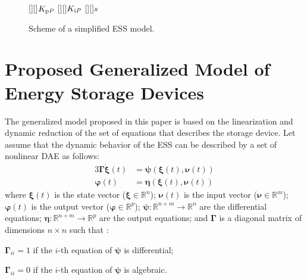 \documentclass[journal, a4paper]{IEEEtran}
\begin{document}
\begin{figure}[h!]
  \begin{center}
    \psfrag{+}{\tiny{$+$}}    
    \psfrag{-}{\tiny{$-$}}
    [][]{$K_{\rm p \it{P}}$}
    [][]{$K_{\rm i \it{P}}$}
[][]{$s$}
    \caption{Scheme of a simplified ESS model.}
    \label{simplescheme}
  \end{center}
\vspace{-0.4cm}
\end{figure}




\section{Proposed Generalized Model of Energy Storage Devices}
\label{sec:genmodel}

The generalized model proposed in this paper is based on the
linearization and dynamic reduction of the set of equations that
describes the storage device.  Let assume that the dynamic behavior of
the ESS can be described by a set of nonlinear DAE as
follows:
\begin{alignat}{3}
  \nonumber \boldsymbol{\Gamma} \dot{\boldsymbol{\xi}}(t) &= 
  \boldsymbol{\psi}(\boldsymbol{\xi}(t),\boldsymbol{\nu}(t))\\
  \boldsymbol{\varphi}(t) &=
  \boldsymbol{\eta}(\boldsymbol{\xi}(t),\boldsymbol{\nu}(t))
  \label{DAE}
\end{alignat}
where $\boldsymbol{\xi}(t)$ is the state vector ($\boldsymbol{\xi} \in
\mathbb{R}^n$); $\boldsymbol{\nu}(t)$ is the input vector
($\boldsymbol{\nu} \in \mathbb{R}^m$); $\boldsymbol{\varphi}(t)$ is
the output vector ($\boldsymbol{\varphi} \in \mathbb{R}^p$);
$\boldsymbol{\psi} : \mathbb{R}^{n+m} \rightarrow \mathbb{R}^n$ are
the differential equations; $\boldsymbol{\eta} : \mathbb{R}^{n+m}
\rightarrow \mathbb{R}^p$ are the output equations; and
$\boldsymbol{\Gamma}$ is a diagonal matrix of dimensions $n \times n$
such that \cite{fabozzi:14}:
\begin{list}{}{}
\item $\boldsymbol{\Gamma}_{ii} = 1$ if the $i$-th equation of
  $\boldsymbol{\psi}$ is differential;
\item $\boldsymbol{\Gamma}_{ii} = 0$ if the $i$-th equation of
  $\boldsymbol{\psi}$ is algebraic.
\end{list}	
\end{document}
